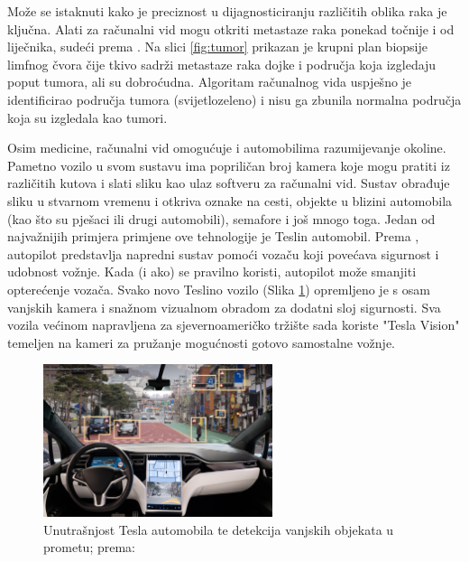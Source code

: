 \documentclass[]{foi} %
\begin{document}
Može se istaknuti kako je preciznost u dijagnosticiranju različitih oblika raka je ključna. Alati za računalni vid mogu otkriti metastaze raka ponekad točnije i od liječnika, sudeći prema \cite{google2}. Na slici \ref{fig:tumor} prikazan je krupni plan biopsije limfnog čvora čije tkivo sadrži metastaze raka dojke i područja koja izgledaju poput tumora, ali su dobroćudna. \cite{google2} Algoritam računalnog vida uspješno je identificirao područja tumora (svijetlozeleno) i nisu ga zbunila normalna područja koja su izgledala kao tumori.

Osim medicine, računalni vid omogućuje i automobilima razumijevanje okoline. Pametno vozilo \cite{adobe} u svom sustavu ima popriličan broj kamera koje mogu pratiti iz različitih kutova i slati sliku kao ulaz softveru za računalni vid. Sustav obrađuje sliku u stvarnom vremenu i otkriva oznake na cesti, objekte u blizini automobila (kao što su pješaci ili drugi automobili), semafore i još mnogo toga. Jedan od najvažnijih primjera primjene ove tehnologije je Teslin automobil.
Prema \cite{tesla}, autopilot predstavlja napredni sustav pomoći vozaču koji povećava sigurnost i udobnost vožnje. Kada (i ako) se pravilno koristi, autopilot može smanjiti opterećenje vozača. Svako novo Teslino vozilo (Slika \ref{fig:tesla}) opremljeno je s osam vanjskih kamera i snažnom vizualnom obradom za dodatni sloj sigurnosti. Sva vozila većinom napravljena za sjevernoameričko tržište sada koriste "Tesla Vision" temeljen na kameri za pružanje mogućnosti gotovo samostalne vožnje.

\begin{figure}[!ht]
    \centering
    \includegraphics[width=0.6\textwidth]{slike/tesla.png}
    \caption{Unutrašnjost Tesla automobila te detekcija vanjskih objekata u prometu; prema: \cite{tesla}}
    \label{fig:tesla}
\end{figure}
\end{document}
